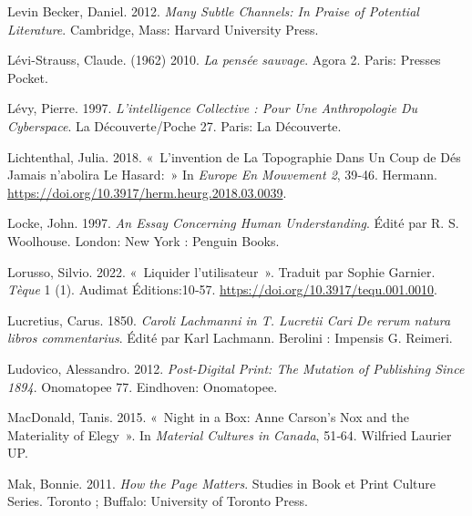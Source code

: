 \begin{CSLReferences}{1}{0}
\leavevmode{}%
Levin Becker, Daniel. 2012. \emph{Many {Subtle Channels}: {In Praise} of
{Potential Literature}}. {Cambridge, Mass}: {Harvard University Press}.

\leavevmode{}%
Lévi-Strauss, Claude. (1962) 2010. \emph{{La pens{é}e sauvage}}. {Agora}
2. {Paris}: {Presses Pocket}.

\leavevmode{}%
Lévy, Pierre. 1997. \emph{L'intelligence Collective : Pour Une
Anthropologie Du Cyberspace}. La {D{é}couverte}/{Poche} 27. {Paris}: {La
D{é}couverte}.

\leavevmode{}%
Lichtenthal, Julia. 2018. {«~L'invention de La Topographie Dans {Un}
Coup de D{é}s Jamais n'abolira Le Hasard:~»} In \emph{Europe En
Mouvement 2}, 39‑46. {Hermann}.
\url{https://doi.org/10.3917/herm.heurg.2018.03.0039}.

\leavevmode{}%
Locke, John. 1997. \emph{An {Essay Concerning Human Understanding}}.
Édité par R. S. Woolhouse. {London}: {New York : Penguin Books}.

\leavevmode{}%
Lorusso, Silvio. 2022. {«~{Liquider l'utilisateur}~»}. Traduit par
Sophie Garnier. \emph{T{è}que} 1 (1). {Audimat {É}ditions}:10‑57.
\url{https://doi.org/10.3917/tequ.001.0010}.

\leavevmode{}%
Lucretius, Carus. 1850. \emph{{Caroli Lachmanni in T. Lucretii Cari De
rerum natura libros commentarius}}. Édité par Karl Lachmann. {Berolini :
Impensis G. Reimeri}.

\leavevmode{}%
Ludovico, Alessandro. 2012. \emph{Post-{Digital Print}: {The Mutation}
of {Publishing Since} 1894}. Onomatopee 77. {Eindhoven}: {Onomatopee}.

\leavevmode{}%
MacDonald, Tanis. 2015. {«~Night in a {Box}: {Anne Carson}'s {Nox} and
the {Materiality} of {Elegy}~»}. In \emph{Material {Cultures} in
{Canada}}, 51‑64. {Wilfried Laurier UP}.

\leavevmode{}%
Mak, Bonnie. 2011. \emph{How the {Page Matters}}. Studies in Book et
Print Culture Series. {Toronto ; Buffalo}: {University of Toronto
Press}.


\end{CSLReferences}
